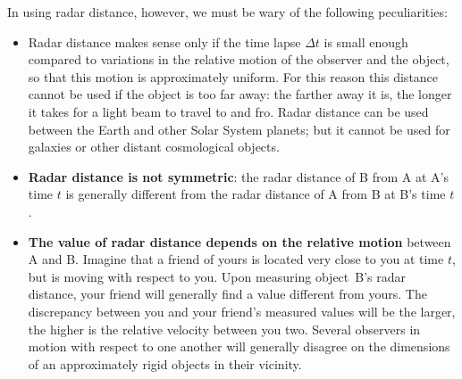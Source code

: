 \documentclass[a4paper,12pt,%
onecolumn,oneside,%
british%
]{memoir}
\newcommand*{\incr}{\Delta}%
\renewcommand*{\|}[1][]{\nonscript\:#1\vert\nonscript\:\mathopen{}}
\newcommand*{\Dt}{\incr t}
\begin{document}
In using radar distance, however, we must be wary of the following peculiarities:
\begin{itemize}[wide]
\item Radar distance makes sense only if the time lapse $\Dt$ is small enough compared to variations in the relative motion of the observer and the object, so that this motion is approximately uniform. For this reason this distance cannot be used if the object is too far away: the farther away it is, the longer it takes for a light beam to travel to and fro. Radar distance can be used between the Earth and other Solar System planets; but it cannot be used for galaxies or other distant cosmological objects.

\item \textbf{Radar distance is not symmetric}: the radar distance of B from A at A's time $t$ is generally different from the radar distance of A from B at B's time $t$.

\item \textbf{The value of radar distance depends on the relative motion} between A and B. Imagine that a friend of yours is located very close to you at time $t$, but is moving with respect to you. Upon measuring object~B's radar distance, your friend will generally find a value different from yours. The discrepancy between you and your friend's measured values will be the larger, the higher is the relative velocity between you two. Several observers in motion with respect to one another will generally disagree on the dimensions of an approximately rigid objects in their vicinity.
\end{itemize}
\end{document}
